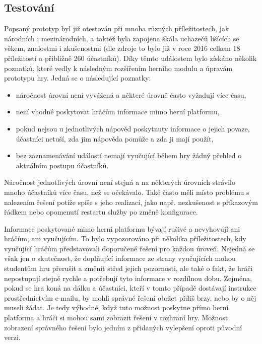 \documentclass[
  digital, %
  oneside, %
  table,   %
  nolof,     %
  nolot,     %
]{fithesis3}
\begin{document}
\subsection{Testování} \label{gameTesting}
Popsaný prototyp byl již otestován při mnoha různých příležitostech, jak národních i mezinárodních, a taktéž byla zapojena škála uchazečů lišících se věkem, znalostmi i zkušenostmi (dle zdroje \cite{ctfDesign} to bylo již v roce 2016 celkem 18 příležitostí a přibližně 260 účastníků).
Díky těmto událostem bylo získáno několik poznatků, které vedly k následným rozšířením herního modulu a úpravám prototypu hry. Jedná se o následující poznatky:
\begin{itemize}
  \item náročnost úrovní není vyvážená a některé úrovně často vyžadují více času,
  \item není vhodné poskytovat hráčům informace mimo herní platformu,
  \item pokud nejsou u jednotlivých nápověd poskytnuty informace o jejich povaze, účastníci netuší, zda jim nápověda pomůže a zda ji mají použít,
  \item bez zaznamenávání událostí nemají vyučující během hry žádný přehled o aktuálním postupu účastníků.
\end{itemize}
Náročnost jednotlivých úrovní není stejná a na některých úrovních strávilo mnoho účastníků více času, než se očekávalo. Také často měli místo problému s nalezením řešení potíže spíše s jeho realizací, jako např. nezkušenost s příkazovým řádkem nebo opomenutí restartu služby po změně konfigurace.\par
Informace poskytované mimo herní platformu bývají rušivé a nevyhovují ani hráčům, ani vyučujícím. To bylo vypozorováno při několika příležitostech, kdy vyučující hráčům představovali doporučené řešení pro každou úroveň. Nejedná se však jen o skutečnost, že doplňující informace ze strany vyučujících mohou studentům hru přerušit a změnit střed jejich pozornosti, ale také o fakt, že hráči nepostupují stejně rychle a potřebují tyto informace v rozdílnou dobu. Zejména, pokud se hra koná na dálku a účastníci, kteří v tomto případě dostávají instrukce prostřednictvím e-mailu, by mohli správné řešení obržet příliš brzy, nebo by o něj museli žádat. Je tedy výhodné, když tuto možnost poskytne přímo herní platforma a hráči si mohou sami zobrazit řešení v rozhraní hry. Možnost zobrazení správného řešení bylo jedním z přidaných vylepšení oproti původní verzi.\par
\end{document}

